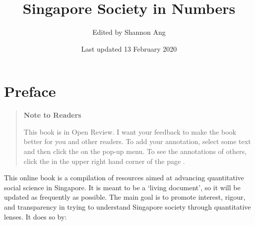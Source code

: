 \documentclass[openany]{book}
\title{Singapore Society in Numbers}
\author{Edited by Shannon Ang}
\date{Last updated 13 February 2020}
\begin{document}
\maketitle

{
\setcounter{tocdepth}{1}
\tableofcontents
}
\chapter*{Preface}\label{preface}

\begin{quote}
\textbf{Note to Readers}

This book is in Open Review. I want your feedback to make the book
better for you and other readers. To add your annotation, {select some
text} and then click the on the pop-up menu. To see the annotations of
others, click the in the upper right hand corner of the page .
\end{quote}

This online book is a compilation of resources aimed at advancing
quantitative social science in Singapore. It is meant to be a `living
document', so it will be updated as frequently as possible. The main
goal is to promote interest, rigour, and transparency in trying to
understand Singapore society through quantitative lenses. It does so by:
\end{document}
